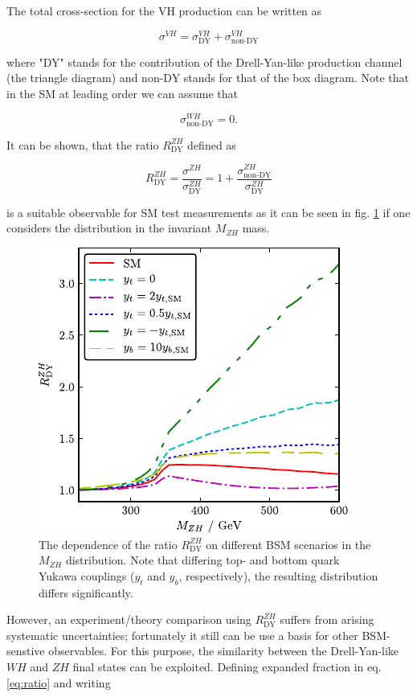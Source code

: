 The total cross-section for the VH production can be written as

\begin{equation*}
	\sigma^{VH} = \sigma^{VH}_\text{DY} + \sigma^{VH}_\text{non-DY}
\end{equation*}

where "DY" stands for the contribution of the Drell-Yan-like production channel (the triangle diagram) and non-DY stands for that of the box diagram. Note that in the SM at leading order we can assume that

\begin{equation*}
	\sigma^{WH}_\text{non-DY} = 0.
\end{equation*}

It can be shown, that the ratio $R^{ZH}_\text{DY}$ defined as

\begin{equation}
	R^{ZH}_\text{DY} = \frac{\sigma^{ZH}}{\sigma^{ZH}_\text{DY}} = 1 + \frac{\sigma^{ZH}_\text{non-DY}}{\sigma^{ZH}_\text{DY}}
	\label{eq:ratio}
\end{equation}

is a suitable observable for SM test measurements as it can be seen in fig. \ref{fig:RZH} if one considers the distribution in the invariant $M_{ZH}$ mass.

\begin{figure}[h!]
	\centering
	\includegraphics[width=0.6\linewidth]{figures/theory/RZH}
	\caption{The dependence of the ratio $R^{ZH}_\text{DY}$ on different BSM scenarios in the $M_{ZH}$ distribution. Note that differing top- and bottom quark Yukawa couplings ($y_t$ and $y_b$, respectively), the resulting distribution differs significantly.}
	\label{fig:RZH}
\end{figure}

However, an experiment/theory comparison using $R^{ZH}_\text{DY}$ suffers from arising systematic uncertainties; fortunately it still can be use a basis for other BSM-senstive observables. For this purpose, the similarity between the Drell-Yan-like $WH$ and $ZH$ final states can be exploited. Defining expanded fraction in eq. \ref{eq:ratio} and writing


